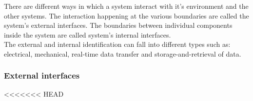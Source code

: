 There are different ways in which a system interact with it's environment and the other systems. The interaction happening at the various boundaries are called the system's external interfaces. The boundaries between individual components inside the system are called system's internal interfaces.\\
The external and internal identification can fall into different types such as: electrical, mechanical, real-time data transfer and storage-and-retrieval of data.

\subsubsection{External interfaces}
<<<<<<< HEAD
